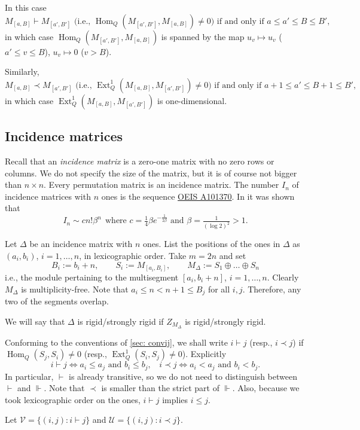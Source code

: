 \documentclass[12pt]{article}
\newcommand{\U}{\mathcal{U}}
\newcommand{\V}{\mathcal{V}}
\newcommand{\Hom}{\operatorname{Hom}}
\newcommand{\Ext}{\operatorname{Ext}}
\newcommand{\IM}{\Delta}
\newcommand{\homr}{\vdash}
\newcommand{\homrt}{\Vdash}
\newcommand{\extr}{\prec}
\begin{document}
In this case
\[
M_{[a,B]}\homr M_{[a',B']}\text{ (i.e., $\Hom_Q(M_{[a',B']},M_{[a,B]})\neq0$) if and only if }a\le a'\le B\le B',
\]
in which case  $\Hom_Q(M_{[a',B']},M_{[a,B]})$ is spanned by the map $u_v\mapsto u_v$ ($a'\le v\le B$), $u_v\mapsto0$ ($v>B$).

Similarly,
\[
M_{[a,B]}\extr M_{[a',B']}\text{ (i.e., $\Ext_Q^1(M_{[a,B]},M_{[a',B']})\neq0$) if and only if }a+1\le a'\le B+1\le B',
\]
in which case  $\Ext_Q^1(M_{[a,B]},M_{[a',B']})$ is one-dimensional.

\subsection{Incidence matrices}

Recall that an \emph{incidence matrix} is a zero-one matrix with no zero rows or columns.
We do not specify the size of the matrix, but it is of course not bigger than $n\times n$.
Every permutation matrix is an incidence matrix.
The number $I_n$ of incidence matrices with $n$ ones is the sequence \href{https://oeis.org/A101370}{OEIS A101370}.
In \cite{MR2255427} it was shown that
\[
I_n\sim cn!\beta^n\ \ \text{where }c=\tfrac14\beta e^{-\frac1{2\beta}}\text{ and }\beta=\tfrac1{(\log 2)^2}>1.
\]


Let $\IM$ be an incidence matrix with $n$ ones.
List the positions of the ones in $\IM$ as $(a_i,b_i)$, $i=1,\dots,n$, in lexicographic order.
Take $m=2n$ and set
\[
B_i:=b_i+n,\qquad S_i:=M_{[a_i,B_i]},\qquad
M_{\IM}:=S_1\oplus\dots\oplus S_n
\]
i.e., the module pertaining to the multisegment $[a_i,b_i+n]$, $i=1,\dots,n$.
Clearly $M_{\IM}$ is multiplicity-free.  Note that $a_i\le n<n+1\le B_j$ for all $i,j$.
Therefore, any two of the segments overlap.

We will say that $\IM$ is rigid/strongly rigid if $Z_{M_{\IM}}$ is rigid/strongly rigid. 

Conforming to the conventions of \cref{sec: convij}, we shall write $i\homr j$ (resp., $i\extr j$) if $\Hom_Q(S_j,S_i)\ne0$ (resp., $\Ext^1_Q(S_i,S_j)\ne0$).
Explicitly
\[
i\homr j\iff a_i\le a_j\text{ and }b_i\le b_j,\ \ \ \ i\extr j\iff a_i<a_j\text{ and }b_i<b_j.
\]
In particular, $\homr$ is already transitive, so we do not need to distinguish between $\homr$ and $\homrt$.
Note that $\extr$ is smaller than the strict part of $\homrt$. Also, because we took lexicographic order on the ones,
$i\homr j$ implies $i\le j$.



Let $\V=\{(i,j):i\homr j\}$ and $\U=\{(i,j):i\extr j\}$. 
\end{document}
